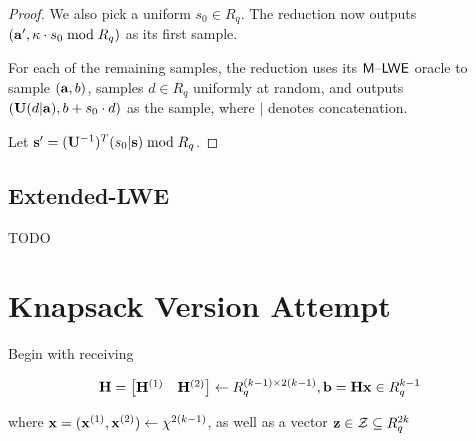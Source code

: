 \documentclass[oribibl,envcountsect,envcountsame]{llncs}
\begin{document}
\begin{proof}
We also pick a uniform $s_0 \in R_q$. The reduction now outputs $(\mathbf{a}',\kappa \cdot s_0 \bmod{R_q})$ as 
its first sample. 

For each of the remaining samples, the reduction uses its $\mathsf{M \text{\textendash} LWE}$ oracle to sample $(\mathbf{a}, b)$, 
samples $d \in R_q$ uniformly at random, and outputs $(\mathbf{U}(d|\mathbf{a}), b + s_0 \cdot d)$ as the sample, where $|$ denotes concatenation.

Let $\mathbf{s}' = (\mathbf{U}^{-1})^{T}(s_0|\mathbf{s}) \bmod{R_q}$. 




\end{proof}

\subsection{Extended-LWE}

TODO

\section{Knapsack Version Attempt}
\label{sec:knapsack}

Begin with receiving 


\[\mathbf{H} = \begin{bmatrix}\mathbf{H}^{(1)}&\mathbf{H}^{(2)}\end{bmatrix} \gets R_q^{(k-1) \times 2(k-1)}, \mathbf{b} = \mathbf{H}\mathbf{x} \in R_q^{k-1}\]


where $\mathbf{x} = (\mathbf{x}^{(1)}, \mathbf{x}^{(2)}) \gets \chi^{2(k-1)}$, as well as a vector $\mathbf{z} \in \mathcal{Z} \subseteq R_q^{2k}$







\end{document}
